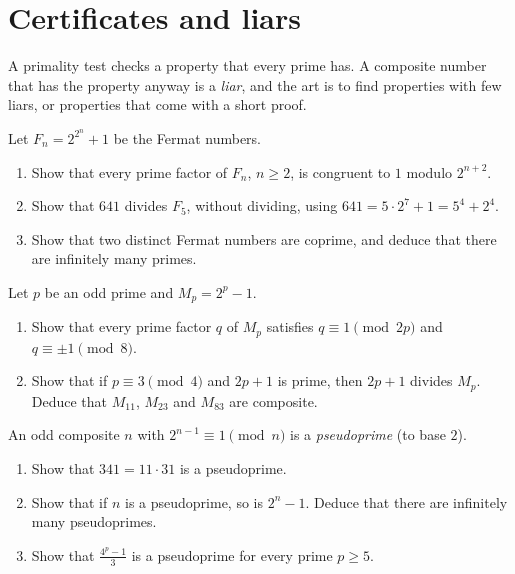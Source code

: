 \section{Certificates and liars}

A primality test checks a property that every prime has. A composite number that has the property anyway is a
\emph{liar}, and the art is to find properties with few liars, or properties that come with a short proof.

\begin{exercise}[$\star$]\label{pb:fermatnum}
Let $F_n=2^{2^n}+1$ be the Fermat numbers.
\begin{enumerate}[label=(\alph*)]
\item Show that every prime factor of $F_n$, $n\ge2$, is congruent to $1$ modulo $2^{n+2}$.
\item Show that $641$ divides $F_5$, without dividing, using $641=5\cdot2^7+1=5^4+2^4$.
\item Show that two distinct Fermat numbers are coprime, and deduce that there are infinitely many primes.
\end{enumerate}
\end{exercise}

\begin{exercise}[$\star$]\label{pb:mersennediv}
Let $p$ be an odd prime and $M_p=2^p-1$.
\begin{enumerate}[label=(\alph*)]
\item Show that every prime factor $q$ of $M_p$ satisfies $q\equiv1\pmod{2p}$ and $q\equiv\pm1\pmod8$.
\item Show that if $p\equiv3\pmod4$ and $2p+1$ is prime, then $2p+1$ divides $M_p$. Deduce that $M_{11}$, $M_{23}$ and
$M_{83}$ are composite.
\end{enumerate}
\end{exercise}

\begin{exercise}[$\star\star$]\label{pb:pseudo}
An odd composite $n$ with $2^{n-1}\equiv1\pmod n$ is a \emph{pseudoprime} (to base $2$).
\begin{enumerate}[label=(\alph*)]
\item Show that $341=11\cdot31$ is a pseudoprime.
\item Show that if $n$ is a pseudoprime, so is $2^n-1$. Deduce that there are infinitely many pseudoprimes.
\item Show that $\frac{4^p-1}3$ is a pseudoprime for every prime $p\ge5$.
\end{enumerate}
\end{exercise}


